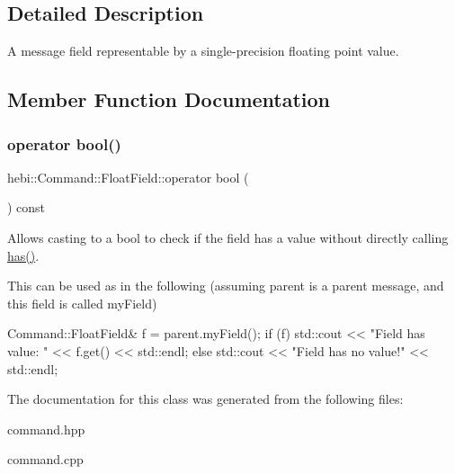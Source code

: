 \subsection{Detailed Description}
A message field representable by a single-\/precision floating point value. 

\subsection{Member Function Documentation}
\mbox{\label{classhebi_1_1Command_1_1FloatField_a3fcbc1334c39f87cd174fd455f3b932d}} 
\subsubsection{\texorpdfstring{operator bool()}{operator bool()}}
{\footnotesize\ttfamily hebi\+::\+Command\+::\+Float\+Field\+::operator bool (\begin{DoxyParamCaption}{ }\end{DoxyParamCaption}) const\hspace{0.3cm}{\ttfamily [explicit]}}



Allows casting to a bool to check if the field has a value without directly calling {\ttfamily \hyperlink{classhebi_1_1Command_1_1FloatField_a80e25ed684a201a7b5f28a9d449a448a}{has()}}. 

This can be used as in the following (assuming \textquotesingle{}parent\textquotesingle{} is a parent message, and this field is called \textquotesingle{}my\+Field\textquotesingle{}) 
\begin{DoxyCode}
Command::FloatField& f = parent.myField();
\textcolor{keywordflow}{if} (f)
  std::cout << \textcolor{stringliteral}{"Field has value: "} << f.get() << std::endl;
\textcolor{keywordflow}{else}
  std::cout << \textcolor{stringliteral}{"Field has no value!"} << std::endl;
\end{DoxyCode}
 

The documentation for this class was generated from the following files\+:\begin{DoxyCompactItemize}
\item 
command.\+hpp\item 
command.\+cpp\end{DoxyCompactItemize}
